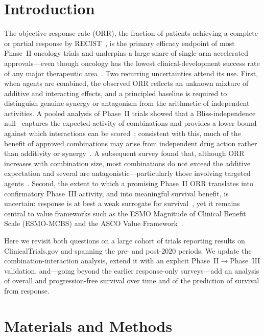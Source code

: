 \documentclass[cancers,article,submit,pdftex,moreauthors]{Definitions/mdpi}
\begin{document}
\section{Introduction}
The objective response rate (ORR), the fraction of patients achieving a complete or
partial response by RECIST~\cite{eisenhauer2009}, is the primary efficacy endpoint
of most Phase~II oncology trials and underpins a large share of single-arm
accelerated approvals---even though oncology has the lowest clinical-development
success rate of any major therapeutic area~\cite{hay2014}. Two recurring
uncertainties attend its use. First, when agents are combined, the observed ORR
reflects an unknown mixture of additive and interacting effects, and a principled
baseline is required to distinguish genuine synergy or antagonism from the
arithmetic of independent activities. A pooled analysis of Phase~II trials showed
that a Bliss-independence null~\cite{bliss1939} captures the expected activity of
combinations and provides a lower bound against which interactions can be
scored~\cite{kang2013}; consistent with this, much of the benefit of approved
combinations may arise from independent drug action rather than additivity or
synergy~\cite{palmer2017}. A subsequent survey found that, although ORR increases
with combination size, most combinations do not exceed the additive expectation and
several are antagonistic---particularly those involving targeted
agents~\cite{azam2021}. Second, the extent to which a promising Phase~II ORR
translates into confirmatory Phase~III activity, and into meaningful survival
benefit, is uncertain: response is at best a weak surrogate for
survival~\cite{prentice1989,prasad2015}, yet it remains central to value frameworks
such as the ESMO Magnitude of Clinical Benefit Scale (ESMO-MCBS) and the ASCO Value
Framework~\cite{cherny2017,schnipper2016}.

Here we revisit both questions on a large cohort of trials reporting results on
ClinicalTrials.gov and spanning the pre- and post-2020 periods. We update the
combination-interaction analysis, extend it with an explicit
Phase~II$\rightarrow$Phase~III validation, and---going beyond the earlier
response-only surveys---add an analysis of overall and progression-free survival
over time and of the prediction of survival from response.

\section{Materials and Methods}
\end{document}
